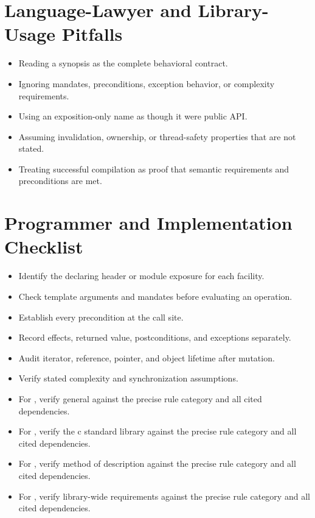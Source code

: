 \documentclass[11pt,letterpaper]{article}
\begin{document}
\section{Language-Lawyer and Library-Usage Pitfalls}
\begin{CornellReferencePitfallBox}\begin{itemize}[label=\textcolor{CornellReferenceAmber}{$\blacktriangleright$}]
\item Reading a synopsis as the complete behavioral contract.
\item Ignoring mandates, preconditions, exception behavior, or complexity requirements.
\item Using an exposition-only name as though it were public API.
\item Assuming invalidation, ownership, or thread-safety properties that are not stated.
\item Treating successful compilation as proof that semantic requirements and preconditions are met.
\end{itemize}\end{CornellReferencePitfallBox}
\section{Programmer and Implementation Checklist}
\begin{CornellReferenceChecklistBox}\begin{itemize}[label=$\square$]
\item Identify the declaring header or module exposure for each facility.
\item Check template arguments and mandates before evaluating an operation.
\item Establish every precondition at the call site.
\item Record effects, returned value, postconditions, and exceptions separately.
\item Audit iterator, reference, pointer, and object lifetime after mutation.
\item Verify stated complexity and synchronization assumptions.
\item For , verify general against the precise rule category and all cited dependencies.
\item For , verify the c standard library against the precise rule category and all cited dependencies.
\item For , verify method of description against the precise rule category and all cited dependencies.
\item For , verify library-wide requirements against the precise rule category and all cited dependencies.
\end{itemize}\end{CornellReferenceChecklistBox}
\end{document}
